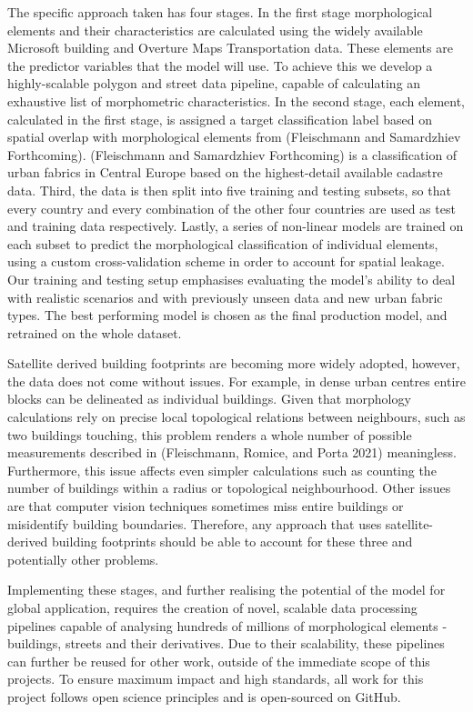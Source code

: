 \documentclass[
  letterpaper,
  DIV=11,
  numbers=noendperiod]{scrartcl}
\begin{document}
The specific approach taken has four stages. In the first stage
morphological elements and their characteristics are calculated using
the widely available Microsoft building and Overture Maps Transportation
data. These elements are the predictor variables that the model will
use. To achieve this we develop a highly-scalable polygon and street
data pipeline, capable of calculating an exhaustive list of morphometric
characteristics. In the second stage, each element, calculated in the
first stage, is assigned a target classification label based on spatial
overlap with morphological elements from (Fleischmann and Samardzhiev
Forthcoming). (Fleischmann and Samardzhiev Forthcoming) is a
classification of urban fabrics in Central Europe based on the
highest-detail available cadastre data. Third, the data is then split
into five training and testing subsets, so that every country and every
combination of the other four countries are used as test and training
data respectively. Lastly, a series of non-linear models are trained on
each subset to predict the morphological classification of individual
elements, using a custom cross-validation scheme in order to account for
spatial leakage. Our training and testing setup emphasises evaluating
the model's ability to deal with realistic scenarios and with previously
unseen data and new urban fabric types. The best performing model is
chosen as the final production model, and retrained on the whole
dataset.

Satellite derived building footprints are becoming more widely adopted,
however, the data does not come without issues. For example, in dense
urban centres entire blocks can be delineated as individual buildings.
Given that morphology calculations rely on precise local topological
relations between neighbours, such as two buildings touching, this
problem renders a whole number of possible measurements described in
(Fleischmann, Romice, and Porta 2021) meaningless. Furthermore, this
issue affects even simpler calculations such as counting the number of
buildings within a radius or topological neighbourhood. Other issues are
that computer vision techniques sometimes miss entire buildings or
misidentify building boundaries. Therefore, any approach that uses
satellite-derived building footprints should be able to account for
these three and potentially other problems.

Implementing these stages, and further realising the potential of the
model for global application, requires the creation of novel, scalable
data processing pipelines capable of analysing hundreds of millions of
morphological elements - buildings, streets and their derivatives. Due
to their scalability, these pipelines can further be reused for other
work, outside of the immediate scope of this projects. To ensure maximum
impact and high standards, all work for this project follows open
science principles and is open-sourced on GitHub.
\end{document}
